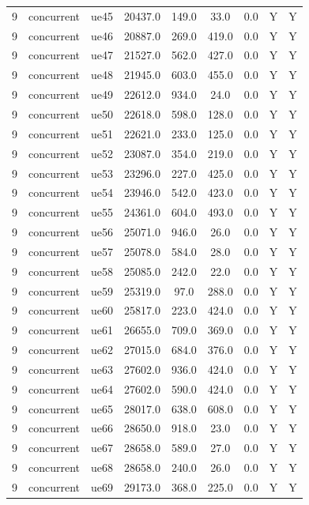 \begin{table}[ht]
\begin{tabular}{|c|c|c|c|c|c|c|c|c|}
9 & concurrent & ue45 & 20437.0 & 149.0 & 33.0 & 0.0 & Y & Y \\
9 & concurrent & ue46 & 20887.0 & 269.0 & 419.0 & 0.0 & Y & Y \\
9 & concurrent & ue47 & 21527.0 & 562.0 & 427.0 & 0.0 & Y & Y \\
9 & concurrent & ue48 & 21945.0 & 603.0 & 455.0 & 0.0 & Y & Y \\
9 & concurrent & ue49 & 22612.0 & 934.0 & 24.0 & 0.0 & Y & Y \\
9 & concurrent & ue50 & 22618.0 & 598.0 & 128.0 & 0.0 & Y & Y \\
9 & concurrent & ue51 & 22621.0 & 233.0 & 125.0 & 0.0 & Y & Y \\
9 & concurrent & ue52 & 23087.0 & 354.0 & 219.0 & 0.0 & Y & Y \\
9 & concurrent & ue53 & 23296.0 & 227.0 & 425.0 & 0.0 & Y & Y \\
9 & concurrent & ue54 & 23946.0 & 542.0 & 423.0 & 0.0 & Y & Y \\
9 & concurrent & ue55 & 24361.0 & 604.0 & 493.0 & 0.0 & Y & Y \\
9 & concurrent & ue56 & 25071.0 & 946.0 & 26.0 & 0.0 & Y & Y \\
9 & concurrent & ue57 & 25078.0 & 584.0 & 28.0 & 0.0 & Y & Y \\
9 & concurrent & ue58 & 25085.0 & 242.0 & 22.0 & 0.0 & Y & Y \\
9 & concurrent & ue59 & 25319.0 & 97.0 & 288.0 & 0.0 & Y & Y \\
9 & concurrent & ue60 & 25817.0 & 223.0 & 424.0 & 0.0 & Y & Y \\
9 & concurrent & ue61 & 26655.0 & 709.0 & 369.0 & 0.0 & Y & Y \\
9 & concurrent & ue62 & 27015.0 & 684.0 & 376.0 & 0.0 & Y & Y \\
9 & concurrent & ue63 & 27602.0 & 936.0 & 424.0 & 0.0 & Y & Y \\
9 & concurrent & ue64 & 27602.0 & 590.0 & 424.0 & 0.0 & Y & Y \\
9 & concurrent & ue65 & 28017.0 & 638.0 & 608.0 & 0.0 & Y & Y \\
9 & concurrent & ue66 & 28650.0 & 918.0 & 23.0 & 0.0 & Y & Y \\
9 & concurrent & ue67 & 28658.0 & 589.0 & 27.0 & 0.0 & Y & Y \\
9 & concurrent & ue68 & 28658.0 & 240.0 & 26.0 & 0.0 & Y & Y \\
9 & concurrent & ue69 & 29173.0 & 368.0 & 225.0 & 0.0 & Y & Y \\

\end{tabular}
\end{table}
